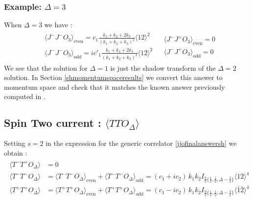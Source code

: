 \documentclass[a4paper,11pt]{article}
\begin{document}
\subsubsection*{Example: $\Delta=3$}
When $\Delta=3$ we have :
\begin{align}
\begin{split}
&\langle J^-J^-O_3 \rangle_{\text{even}} = c_1 \frac{k_1+k_2+2k_3}{(k_1+k_2+k_3)^2}\langle 12 \rangle^2\\[5 pt]
&\langle J^-J^-O_3 \rangle_{\text{odd}} = ic'_1 \frac{k_1+k_2+2k_3}{(k_1+k_2+k_3)^2}\langle 12 \rangle^2
\end{split}
\begin{split}
&\langle J^-J^+O_3 \rangle_{\text{even}} =0\\[5 pt]
&\langle J^-J^+O_3 \rangle_{\text{odd}} =0
\end{split}
\end{align}
We see that the solution for $\Delta=1$ is just the shadow transform of the $\Delta=2$ solution. In Section \ref{shmomentumspaceresults} we convert this answer to momentum space and check that it matches the known answer previously computed in \cite{Jain:2021wyn}. 

\subsection*{Spin Two current : $\langle TTO_\Delta\rangle$}
Setting $s=2$ in the expression for the generic correlator \eqref{jjofinalanswersh} we obtain :
\begin{align}
\label{ttodeltasph}
\begin{split}
\langle T^- T^+ O_{\Delta} \rangle &= 0\\
\langle T^-T^- O_{\Delta} \rangle&=\langle T^-T^- O_{\Delta} \rangle_{\text{even}}+\langle T^-T^- O_{\Delta} \rangle_{\text{odd}}=\left(c_1+ i c_2\right)\,k_1 k_2 I_{\frac{9}{2}\{\frac{1}{2},\frac{1}{2},\Delta-\frac{3}{2}\}} \langle 12 \rangle^4\\[5 pt]
\langle T^+T^+ O_{\Delta} \rangle&=\langle T^+ T^+ O_{\Delta} \rangle_{\text{even}}+\langle T^+ T^+ O_{\Delta} \rangle_{\text{odd}}=\left(c_1 - i c_2\right)\,k_1 k_2 I_{\frac{9}{2}\{\frac{1}{2},\frac{1}{2},\Delta-\frac{3}{2}\}} \langle \bar 1\bar 2 \rangle^4\\[5 pt]
\end{split}
\end{align}
\end{document}
